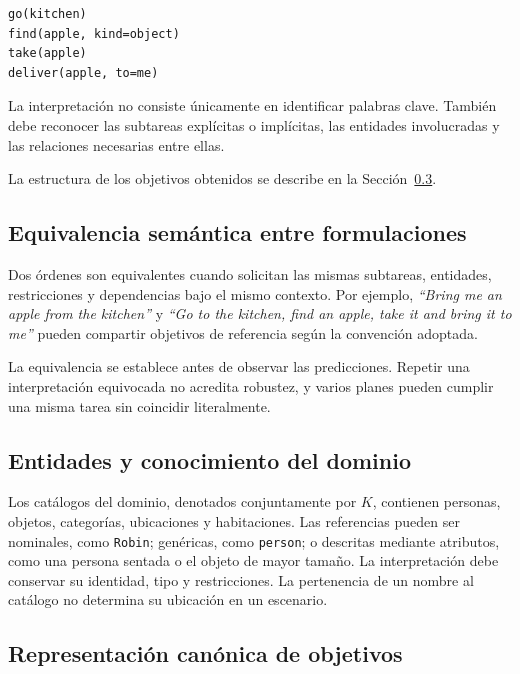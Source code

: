 \begin{verbatim}
go(kitchen)
find(apple, kind=object)
take(apple)
deliver(apple, to=me)
\end{verbatim}

La interpretación no consiste únicamente en identificar palabras
clave. También debe reconocer las subtareas explícitas o implícitas, las
entidades involucradas y las relaciones necesarias entre ellas.

La estructura de los objetivos obtenidos se describe en la Sección~\ref{subsec:objetivos_canonicos}.


\subsection{Equivalencia semántica entre formulaciones}
\label{subsec:equivalencia_semantica}

Dos órdenes son equivalentes cuando solicitan las mismas subtareas, entidades, restricciones y dependencias bajo el mismo contexto. Por ejemplo, \textit{``Bring me an apple from the kitchen''} y \textit{``Go to the kitchen, find an apple, take it and bring it to me''} pueden compartir objetivos de referencia según la convención adoptada.

La equivalencia se establece antes de observar las predicciones. Repetir una interpretación equivocada no acredita robustez, y varios planes pueden cumplir una misma tarea sin coincidir literalmente.

\subsection{Entidades y conocimiento del dominio}
\label{subsec:entidades_dominio}

Los catálogos del dominio, denotados conjuntamente por $K$, contienen personas, objetos, categorías, ubicaciones y habitaciones. Las referencias pueden ser nominales, como \texttt{Robin}; genéricas, como \texttt{person}; o descritas mediante atributos, como una persona sentada o el objeto de mayor tamaño. La interpretación debe conservar su identidad, tipo y restricciones. La pertenencia de un nombre al catálogo no determina su ubicación en un escenario.

\subsection{Representación canónica de objetivos}
\label{subsec:objetivos_canonicos}


